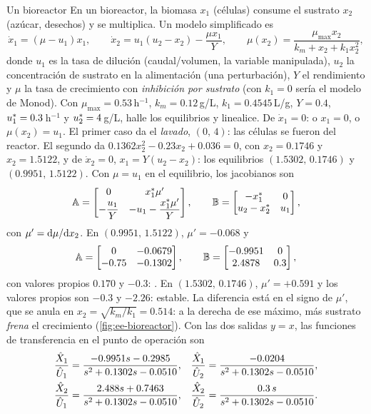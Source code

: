 \begin{ejemplo}[label=ej:ee-bioreactor]{Un bioreactor}
En un bioreactor, la biomasa $x_1$ (células) consume el sustrato $x_2$ (azúcar, desechos) y se multiplica. Un modelo simplificado es~\citep{Beq03}
\[
  \dot x_1=(\mu-u_1)x_1,\qquad \dot x_2=u_1(u_2-x_2)-\frac{\mu x_1}{Y},\qquad
  \mu(x_2)=\frac{\mu_{\max}x_2}{k_m+x_2+k_1x_2^2},
\]
donde $u_1$ es la tasa de dilución (caudal/volumen, la variable manipulada), $u_2$ la concentración de sustrato en la alimentación (una perturbación), $Y$ el rendimiento y $\mu$ la tasa de crecimiento con \emph{inhibición por sustrato} (con $k_1=0$ sería el modelo de Monod). Con $\mu_{\max}=0.53$\,h$^{-1}$, $k_m=0.12$\,g/L, $k_1=0.4545$\,L/g, $Y=0.4$, $u^{*}_1=0.3$\,h$^{-1}$ y $u^{*}_2=4$\,g/L, halle los equilibrios y linealice.
\solucion De $\dot x_1=0$: o $x_1=0$, o $\mu(x_2)=u_1$. El primer caso da el \emph{lavado}, $(0,\,4)$: las células se fueron del reactor. El segundo da $0.1362x_2^2-0.23x_2+0.036=0$, con $x_2=0.1746$ y $x_2=1.5122$, y de $\dot x_2=0$, $x_1=Y(u_2-x_2)$: los equilibrios $(1.5302,\,0.1746)$ y $(0.9951,\,1.5122)$. Con $\mu=u_1$ en el equilibrio, los jacobianos son
\[
  \mathbb{A}=\begin{bmatrix}0&x^{*}_1\mu'\\-\dfrac{u_1}{Y}&-u_1-\dfrac{x^{*}_1\mu'}{Y}\end{bmatrix},\qquad
  \mathbb{B}=\begin{bmatrix}-x^{*}_1&0\\u_2-x^{*}_2&u_1\end{bmatrix},
\]
con $\mu'=\mathrm{d}\mu/\mathrm{d} x_2$. En $(0.9951,\,1.5122)$, $\mu'=-0.068$ y
\[
  \mathbb{A}=\begin{bmatrix}0&-0.0679\\-0.75&-0.1302\end{bmatrix},\qquad
  \mathbb{B}=\begin{bmatrix}-0.9951&0\\2.4878&0.3\end{bmatrix},
\]
con valores propios $0.170$ y $-0.3$: . En $(1.5302,\,0.1746)$, $\mu'=+0.591$ y los valores propios son $-0.3$ y $-2.26$: estable. La diferencia está en el signo de $\mu'$, que se anula en $x_2=\sqrt{k_m/k_1}=0.514$: a la derecha de ese máximo, más sustrato \emph{frena} el crecimiento (\cref{fig:ee-bioreactor}). Con las dos salidas $y=x$, las funciones de transferencia en el punto de operación son
\begin{align*}
  \frac{\hat{X}_1}{\hat{U}_1}&=\frac{-0.9951s-0.2985}{s^2+0.1302s-0.0510}, &
  \frac{\hat{X}_1}{\hat{U}_2}&=\frac{-0.0204}{s^2+0.1302s-0.0510},\\
  \frac{\hat{X}_2}{\hat{U}_1}&=\frac{2.488s+0.7463}{s^2+0.1302s-0.0510}, &
  \frac{\hat{X}_2}{\hat{U}_2}&=\frac{0.3\,s}{s^2+0.1302s-0.0510}.
\end{align*}
\end{ejemplo}

